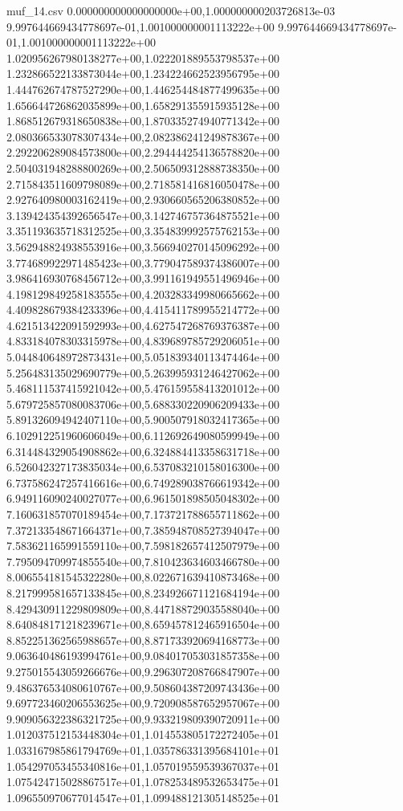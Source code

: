 \begin{filecontents*}{muf_14.csv}
0.000000000000000000e+00,1.000000000203726813e-03
9.997644669434778697e-01,1.001000000001113222e+00
9.997644669434778697e-01,1.001000000001113222e+00
1.020956267980138277e+00,1.022201889553798537e+00
1.232866522133873044e+00,1.234224662523956795e+00
1.444762674787527290e+00,1.446254484877499635e+00
1.656644726862035899e+00,1.658291355915935128e+00
1.868512679318650838e+00,1.870335274940771342e+00
2.080366533078307434e+00,2.082386241249878367e+00
2.292206289084573800e+00,2.294444254136578820e+00
2.504031948288800269e+00,2.506509312888738350e+00
2.715843511609798089e+00,2.718581416816050478e+00
2.927640980003162419e+00,2.930660565206380852e+00
3.139424354392656547e+00,3.142746757364875521e+00
3.351193635718312525e+00,3.354839992575762153e+00
3.562948824938553916e+00,3.566940270145096292e+00
3.774689922971485423e+00,3.779047589374386007e+00
3.986416930768456712e+00,3.991161949551496946e+00
4.198129849258183555e+00,4.203283349980665662e+00
4.409828679384233396e+00,4.415411789955214772e+00
4.621513422091592993e+00,4.627547268769376387e+00
4.833184078303315978e+00,4.839689785729206051e+00
5.044840648972873431e+00,5.051839340113474464e+00
5.256483135029690779e+00,5.263995931246427062e+00
5.468111537415921042e+00,5.476159558413201012e+00
5.679725857080083706e+00,5.688330220906209433e+00
5.891326094942407110e+00,5.900507918032417365e+00
6.102912251960606049e+00,6.112692649080599949e+00
6.314484329054908862e+00,6.324884413358631718e+00
6.526042327173835034e+00,6.537083210158016300e+00
6.737586247257416616e+00,6.749289038766619342e+00
6.949116090240027077e+00,6.961501898505048302e+00
7.160631857070189454e+00,7.173721788655711862e+00
7.372133548671664371e+00,7.385948708527394047e+00
7.583621165991559110e+00,7.598182657412507979e+00
7.795094709974855540e+00,7.810423634603466780e+00
8.006554181545322280e+00,8.022671639410873468e+00
8.217999581657133845e+00,8.234926671121684194e+00
8.429430911229809809e+00,8.447188729035588040e+00
8.640848171218239671e+00,8.659457812465916504e+00
8.852251362565988657e+00,8.871733920694168773e+00
9.063640486193994761e+00,9.084017053031857358e+00
9.275015543059266676e+00,9.296307208766847907e+00
9.486376534080610767e+00,9.508604387209743436e+00
9.697723460206553625e+00,9.720908587652957067e+00
9.909056322386321725e+00,9.933219809390720911e+00
1.012037512153448304e+01,1.014553805172272405e+01
1.033167985861794769e+01,1.035786331395684101e+01
1.054297053455340816e+01,1.057019559539367037e+01
1.075424715028867517e+01,1.078253489532653475e+01
1.096550970677014547e+01,1.099488121305148525e+01

\end{filecontents*}
